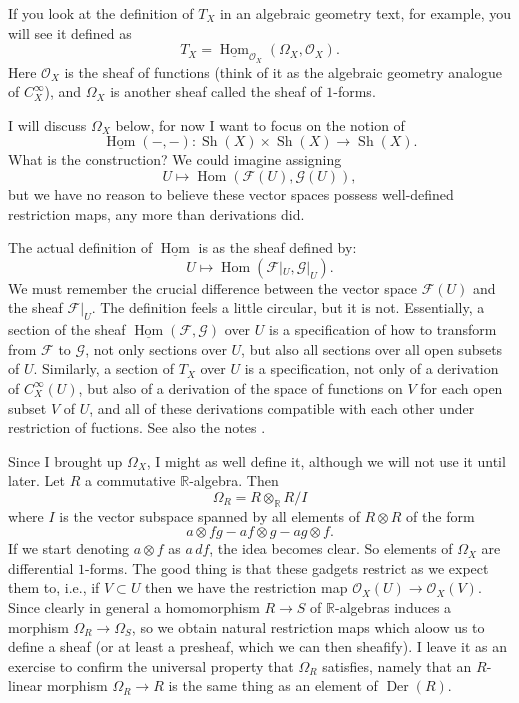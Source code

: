 \documentclass[12pt]{article}
\theoremstyle{plain}
\theoremstyle{definition}
\numberwithin{equation}{section}
\DeclareMathOperator{\sheaves}{Sh}
\DeclareMathOperator{\Der}{Der}
\DeclareMathOperator{\Hom}{Hom}
\newcommand{\Om}{\Omega}
\newcommand{\R}{\mathbb{R}}
\newcommand{\CF}{\mathcal{F}}
\newcommand{\CG}{\mathcal{G}}
\newcommand{\OO}{\mathcal{O}}
\begin{document}
If you look at the definition of $T_X$ in an algebraic geometry text, {\cite[p. 180]{Hartshorne}} for example, you will see it defined as
\[
T_X = \underline{\Hom}_{\OO_X}(\Omega_X, \OO_X).
\]
Here $\OO_X$ is the sheaf of functions (think of it as the algebraic geometry analogue of $C_X^\infty$), and $\Omega_X$ is another sheaf called the sheaf of $1$-forms.


I will discuss $\Om_X$ below, for now I want to focus on the notion of
\[
\underline{\Hom}(-, -) : \sheaves(X) \times \sheaves(X) \rightarrow \sheaves(X).
\]
What is the construction? We could imagine assigning
\[
U \mapsto \Hom(\CF(U), \CG(U)),
\]
but we have no reason to believe these vector spaces possess well-defined restriction maps, any more than derivations did.

The actual definition of $\underline{\Hom}$ is as the sheaf defined by:
\[
U \mapsto \Hom(\CF|_U, \CG|_U).
\]
We must remember the crucial difference between the vector space $\CF(U)$ and the sheaf $\CF|_U$. The definition feels a little circular, but it is not. Essentially, a section of the sheaf $\underline{\Hom}(\CF, \CG)$ over $U$ is a specification of how to transform from $\CF$ to $\CG$, not only sections over $U$, but also all sections over all open subsets of $U$. Similarly, a section of $T_X$ over $U$ is a specification, not only of a derivation of $C_X^\infty(U)$, but also of a derivation of the space of functions on $V$ for each open subset $V$ of $U$, and all of these derivations compatible with each other under restriction of fuctions. See also the notes {\cite{Smadja}}.

Since I brought up $\Om_X$, I might as well define it, although we will not use it until later. Let $R$ a commutative $\R$-algebra. Then
\[
\Om_{R} = R \otimes_\R R / I
\]
where $I$ is the vector subspace spanned by all elements of $R \otimes R$ of the form
\[
a \otimes fg - af \otimes g - ag \otimes f.
\]
If we start denoting $a \otimes f$ as $a \, df$, the idea becomes clear. So elements of $\Om_X$ are differential $1$-forms. The good thing is that these gadgets restrict as we expect them to, i.e., if $V \subset U$ then we have the restriction map $\OO_X(U) \rightarrow \OO_X(V)$. Since clearly in general a homomorphism $R \rightarrow S$ of $\R$-algebras induces a morphism $\Om_R \rightarrow \Om_S$, so we obtain natural restriction maps which aloow us to define a sheaf (or at least a presheaf, which we can then sheafify). I leave it as an exercise to confirm the universal property that $\Om_R$ satisfies, namely that an $R$-linear morphism $\Om_R \rightarrow R$ is the same thing as an element of $\Der(R)$.
\end{document}
